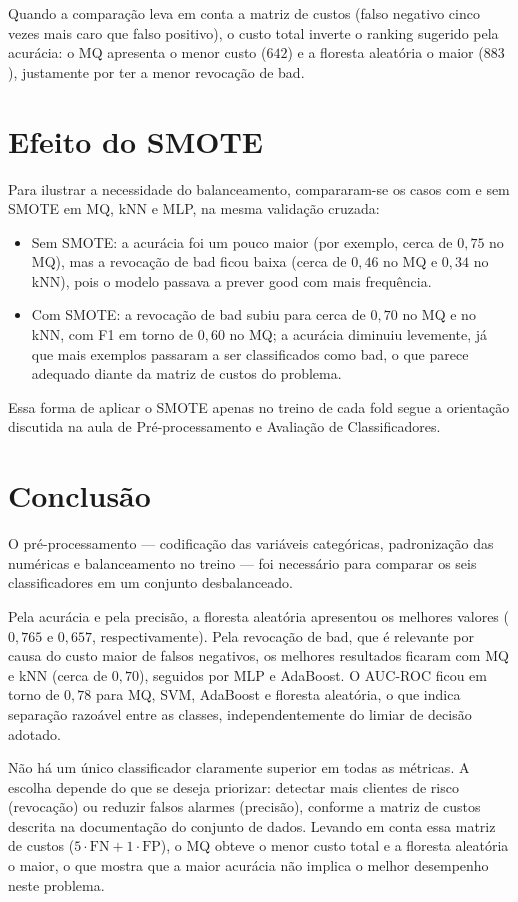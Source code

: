 \documentclass[12pt,a4paper]{article}
\begin{document}
Quando a compara\c{c}\~ao leva em conta a matriz de custos (falso negativo cinco vezes mais caro que falso positivo), o custo total inverte o ranking sugerido pela acur\'acia: o MQ apresenta o menor custo ($642$) e a floresta aleat\'oria o maior ($883$), justamente por ter a menor revoca\c{c}\~ao de bad.

\section*{Efeito do SMOTE}

Para ilustrar a necessidade do balanceamento, compararam-se os casos com e sem SMOTE em MQ, kNN e MLP, na mesma valida\c{c}\~ao cruzada:

\begin{itemize}
  \item Sem SMOTE: a acur\'acia foi um pouco maior (por exemplo, cerca de $0{,}75$ no MQ), mas a revoca\c{c}\~ao de bad ficou baixa (cerca de $0{,}46$ no MQ e $0{,}34$ no kNN), pois o modelo passava a prever good com mais frequ\^encia.
  \item Com SMOTE: a revoca\c{c}\~ao de bad subiu para cerca de $0{,}70$ no MQ e no kNN, com F1 em torno de $0{,}60$ no MQ; a acur\'acia diminuiu levemente, j\'a que mais exemplos passaram a ser classificados como bad, o que parece adequado diante da matriz de custos do problema.
\end{itemize}

Essa forma de aplicar o SMOTE apenas no treino de cada fold segue a orienta\c{c}\~ao discutida na aula de Pr\'e-processamento e Avalia\c{c}\~ao de Classificadores.

\section*{Conclusão}

O pr\'e-processamento --- codifica\c{c}\~ao das vari\'aveis categ\'oricas, padroniza\c{c}\~ao das num\'ericas e balanceamento no treino --- foi necess\'ario para comparar os seis classificadores em um conjunto desbalanceado.

Pela acur\'acia e pela precis\~ao, a floresta aleat\'oria apresentou os melhores valores ($0{,}765$ e $0{,}657$, respectivamente).
Pela revoca\c{c}\~ao de bad, que \'e relevante por causa do custo maior de falsos negativos, os melhores resultados ficaram com MQ e kNN (cerca de $0{,}70$), seguidos por MLP e AdaBoost.
O AUC-ROC ficou em torno de $0{,}78$ para MQ, SVM, AdaBoost e floresta aleat\'oria, o que indica separa\c{c}\~ao razo\'avel entre as classes, independentemente do limiar de decis\~ao adotado.

N\~ao h\'a um \'unico classificador claramente superior em todas as m\'etricas.
A escolha depende do que se deseja priorizar: detectar mais clientes de risco (revoca\c{c}\~ao) ou reduzir falsos alarmes (precis\~ao), conforme a matriz de custos descrita na documenta\c{c}\~ao do conjunto de dados.
Levando em conta essa matriz de custos ($5\cdot\text{FN} + 1\cdot\text{FP}$), o MQ obteve o menor custo total e a floresta aleat\'oria o maior, o que mostra que a maior acur\'acia n\~ao implica o melhor desempenho neste problema.
\end{document}
